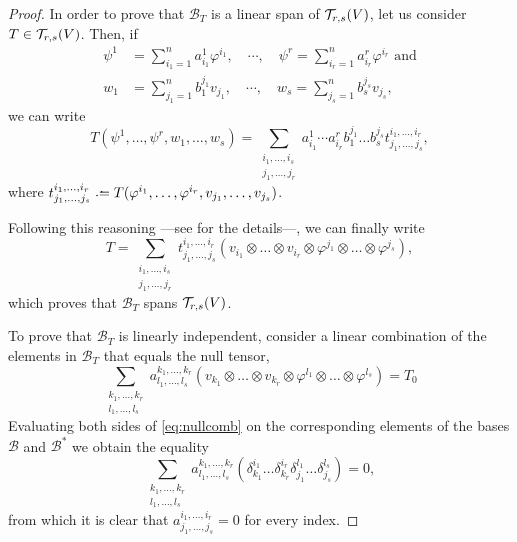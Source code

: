 \begin{proof}

	In order to prove that $\mathcal{B}_T$ is a linear span of ${\mathcal T}_{r,s}(V)$, let us consider $T\in{\mathcal T}_{r,s}(V)$. Then, if
	\begin{align*}
		\psi^1& = \sum_{i_1 = 1}^n a_{i_1}^1 \varphi^{i_1},\quad \cdots,\quad \psi^r = \sum_{i_r = 1}^n a_{i_r}^r \varphi^{i_r} \textrm{ and} \\
		w_1 &= \sum_{j_1 = 1}^n b^{j_1}_1 v_{j_1},\quad \cdots,\quad w_s = \sum_{j_s = 1}^n b^{j_s}_s v_{j_s},
	\end{align*}
	we can write
	\[
		T(\psi^1, \dots, \psi^r, w_1, \dots, w_s) = \sum_{\substack{i_1,\dots,i_s\\j_1,\dots,j_r}} a_{i_1}^1 \cdots a_{i_r}^r b^{j_1}_1 \dots b^{j_s}_s t_{j_1, \dots, j_s}^{i_1, \dots, i_r},
	\]
	where $t_{j_1, \dots, j_s}^{i_1, \dots, i_r} \defeq T(\varphi^{i_1}, \dots, \varphi^{i_r}, v_{j_1}, \dots, v_{j_s})$.

	Following this reasoning ---see \cite{romero86} for the details---, we can finally write
	\[
		T = \sum_{\substack{i_1,\dots,i_s\\j_1,\dots,j_r}} t_{j_1, \dots, j_s}^{i_1, \dots, i_r} \left( v_{i_1} \otimes \dots \otimes v_{i_r} \otimes \varphi^{j_1} \otimes \dots \otimes \varphi^{j_s} \right),
	\]
	which proves that $\mathcal{B}_T$ spans ${\mathcal T}_{r,s}(V)$.

	To prove that $\mathcal{B}_T$ is linearly independent, consider a linear combination of the elements in $\mathcal{B}_T$ that equals the null tensor,
	\begin{equation}
		\label{eq:nullcomb}
		\sum_{\substack{k_1,\dots,k_r\\l_1,\dots,l_s}} a^{k_1,\dots,k_r}_{l_1,\dots,l_s} \left( v_{k_1} \otimes \dots \otimes v_{k_r} \otimes \varphi^{l_1} \otimes \dots \otimes \varphi^{l_s} \right) = T_0
	\end{equation}
	Evaluating both sides of \autoref{eq:nullcomb} on the corresponding elements of the bases $\mathcal{B}$ and $\mathcal{B}^*$ we obtain the equality
	\[
		\sum_{\substack{k_1,\dots,k_r\\l_1,\dots,l_s}} a^{k_1,\dots,k_r}_{l_1,\dots,l_s} \left( \delta^{i_1}_{k_1} \dots \delta^{i_r}_{k_r} \delta^{l_1}_{j_1} \dots \delta^{l_s}_{j_s} \right) = 0,
	\]
	from which it is clear that $a^{i_1,\dots,i_r}_{j_1,\dots,j_s} = 0$ for every index.
\end{proof}

